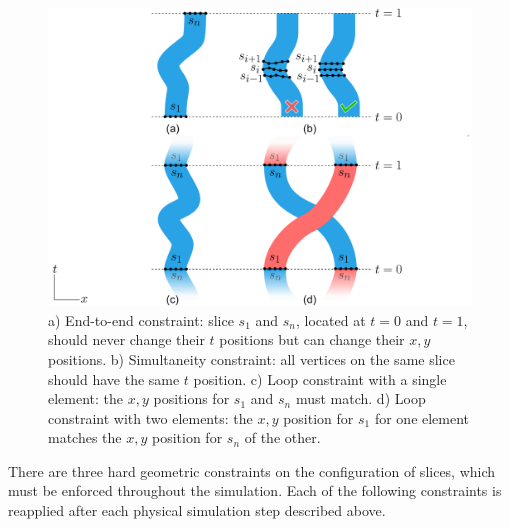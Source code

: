 \begin{figure}[h!]
\centering
\includegraphics[width=1.0\textwidth]{figures/animationpak/constraints.pdf} 
\caption[Constraints]
{\label{fig_animationpak_constraints} 
a) End-to-end constraint: 
slice $s_1$ and $s_n$, located at 
$t = 0$ and $t = 1$,  should never change their $t$ positions but can change their $x, y$ positions. 
b) Simultaneity constraint: all vertices on the same slice should have the same $t$ position.
c) Loop constraint with a single element: the $x,y$ positions for $s_1$ and $s_n$ must match.
d) Loop constraint with two elements: the $x, y$ position for $s_1$  
for one element matches the $x, y$ position for $s_n$ of the other.
}
\end{figure}



There are three hard geometric constraints on the configuration of slices,
which must be enforced throughout the simulation.  Each of the following
constraints is reapplied after each physical simulation step described above.

